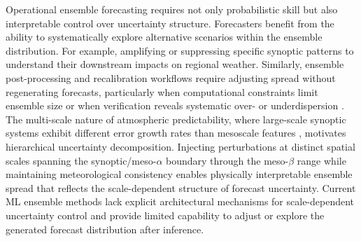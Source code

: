 \documentclass{agujournal2019}
\begin{document}
Operational ensemble forecasting requires not only probabilistic skill but also interpretable control over uncertainty structure. Forecasters benefit from the ability to systematically explore alternative scenarios within the ensemble distribution. For example, amplifying or suppressing specific synoptic patterns to understand their downstream impacts on regional weather. Similarly, ensemble post-processing and recalibration workflows require adjusting spread without regenerating forecasts, particularly when computational constraints limit ensemble size or when verification reveals systematic over- or underdispersion \cite{hamill1997verification, vannitsem2021statistical}. The multi-scale nature of atmospheric predictability, where large-scale synoptic systems exhibit different error growth rates than mesoscale features \cite{tribbia2004scale}, motivates hierarchical uncertainty decomposition. Injecting perturbations at distinct spatial scales spanning the synoptic/meso-$\alpha$ boundary through the meso-$\beta$ range while maintaining meteorological consistency enables physically interpretable ensemble spread that reflects the scale-dependent structure of forecast uncertainty. Current ML ensemble methods lack explicit architectural mechanisms for scale-dependent uncertainty control and provide limited capability to adjust or explore the generated forecast distribution after inference.
\end{document}
